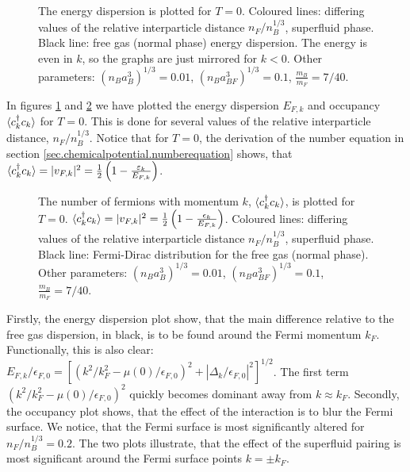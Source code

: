\begin{figure} 
\begin{center}  
  
\caption{The energy dispersion is plotted for $T = 0$. Coloured lines: differing values of the relative interparticle distance $n_F / n_B^{1/3}$, superfluid phase. Black line: free gas (normal phase) energy dispersion. The energy is even in $k$, so the graphs are just mirrored for $k < 0$. Other parameters: $(n_Ba_{B}^3)^{1/3} = 0.01$, $(n_Ba_{BF}^3)^{1/3} = 0.1$, $\frac{m_B}{m_F} = 7/40$. }  
\label{fig.EnergyDispersion}  
\end{center}    
\end{figure}

In figures \ref{fig.EnergyDispersion} and \ref{fig.Occupancy} we have plotted the energy dispersion $E_{F,k}$ and occupancy $\braket{c_k^\dagger c_k}$ for $T = 0$. This is done for several values of the relative interparticle distance, $n_F / n_B^{1/3}$. Notice that for $T = 0$, the derivation of the number equation in section \ref{sec.chemicalpotential.numberequation} shows, that $\braket{c_k^\dagger c_k} = |v_{F,k}|^2 = \frac{1}{2}\left(1 -  \frac{\varepsilon_k}{E_{F,k}}\right)$. 

\begin{figure} 
\begin{center}  
  
\caption{The number of fermions with momentum $k$, $\braket{c_k^\dagger c_k}$, is plotted for $T = 0$. $\braket{c_k^\dagger c_k} = |v_{F,k}|^2 = \frac{1}{2}\left(1 - \frac{\epsilon_k}{E_{F,k}}\right)$. Coloured lines: differing values of the relative interparticle distance $n_F / n_B^{1/3}$, superfluid phase. Black line: Fermi-Dirac distribution for the free gas (normal phase). Other parameters: $(n_Ba_{B}^3)^{1/3} = 0.01$, $(n_Ba_{BF}^3)^{1/3} = 0.1$, $\frac{m_B}{m_F} = 7/40$. }  
\label{fig.Occupancy}  
\end{center}    
\end{figure}

Firstly, the energy dispersion plot show, that the main difference relative to the free gas dispersion, in black, is to be found around the Fermi momentum $k_F$. Functionally, this is also clear: $E_{F,k}/\epsilon_{F,0} = [(k^2/k_F^2 - \mu(0)/\epsilon_{F,0})^2 + |\Delta_k/\epsilon_{F,0}|^2 ]^{1/2}$. The first term $(k^2/k_F^2 - \mu(0)/\epsilon_{F,0})^2$ quickly becomes dominant away from $k\approx k_F$. Secondly, the occupancy plot shows, that the effect of the interaction is to blur the Fermi surface. We notice, that the Fermi surface is most significantly altered for $n_F / n_B^{1/3} = 0.2$. The two plots illustrate, that the effect of the superfluid pairing is most significant around the Fermi surface points $k = \pm k_F$.  

